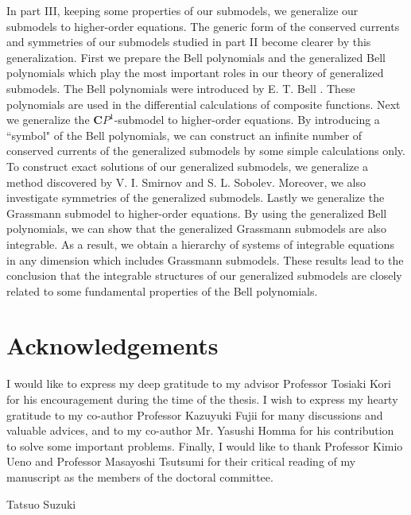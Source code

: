 \documentclass[makeidx,12pt,openany]{report}
\begin{document}
In part III, keeping some properties of our 
submodels, we generalize our submodels to higher-order equations. 
The generic form of the conserved currents and symmetries of our 
submodels studied in part II become clearer by this generalization. 
First we prepare the Bell polynomials and the generalized Bell polynomials 
which play the most important roles in our theory of generalized submodels. 
The Bell polynomials were introduced by E. T. Bell \cite{Bell}. 
These polynomials are used in the differential calculations of composite 
functions. 
Next we generalize the $\mathbf{C}P^1$-submodel to higher-order equations. 
By introducing a ``symbol" of the Bell polynomials, 
we can construct an infinite number of conserved currents of the generalized 
submodels by some simple calculations only. 
To construct exact solutions of our generalized submodels, we generalize 
a method discovered by V. I. Smirnov and S. L. Sobolev. 
Moreover, we also investigate symmetries of the generalized submodels. 
Lastly we generalize the Grassmann submodel to higher-order equations. 
By using the 
generalized Bell polynomials, we can show that the generalized 
Grassmann submodels are also integrable. As a result, 
we obtain a hierarchy of systems of integrable equations in any dimension 
which includes Grassmann submodels. 
These results lead to the conclusion that 
the integrable structures of our generalized submodels 
are closely related to 
some fundamental properties of the Bell polynomials. 

 \section*{Acknowledgements}

\hspace*{12pt} 
I would like to express my deep gratitude to my advisor 
Professor Tosiaki Kori for his 
encouragement during the time of the thesis. 
I wish to express my hearty gratitude to my co-author Professor Kazuyuki Fujii 
for many discussions and valuable advices, 
and to my co-author Mr. Yasushi Homma for 
his contribution to solve some important problems. 
Finally, I would like to 
thank Professor Kimio Ueno and Professor Masayoshi Tsutsumi for their critical 
reading of my manuscript as the members of the doctoral committee. 

\medskip
\begin{flushright}
Tatsuo Suzuki
\end{flushright}

\tableofcontents
\end{document}
